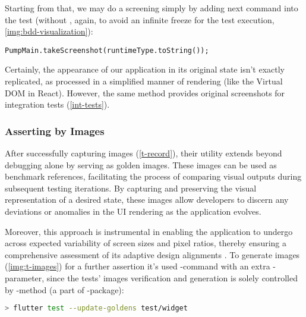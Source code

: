 \noindent Starting from that, we may do a screening simply by adding next command into the test (without , 
again, to avoid an infinite freeze for the test execution, \cref{img:bdd-visualization}):

\begin{lstlisting}
PumpMain.takeScreenshot(runtimeType.toString());
\end{lstlisting}  


Certainly, the appearance of our application in its original state isn't exactly replicated, as processed in a 
simplified manner of rendering (like the Virtual DOM in React). However, the same method provides original screenshots 
for integration tests (\cref{int-tests}).


\subsubsection{Asserting by Images}

After successfully capturing images (\cref{t-record}), their utility extends beyond debugging alone by serving as 
golden images. These images can be used as benchmark references, facilitating the process of comparing visual 
outputs during subsequent testing iterations. By capturing and preserving the visual representation of a desired state, 
these images allow developers to discern any deviations or anomalies in the UI rendering as the application evolves. 

Moreover, this approach is instrumental in enabling the application to undergo across expected variability of screen 
sizes and pixel ratios, thereby ensuring a comprehensive assessment of its adaptive design alignments 
. To generate images (\cref{img:t-images}) for a further assertion it's used -command with 
an extra -parameter, since the tests' images verification and generation is solely controlled by
-method (a part of -package):

\begin{lstlisting}[language=bash]
> flutter test --update-goldens test/widget
\end{lstlisting}


